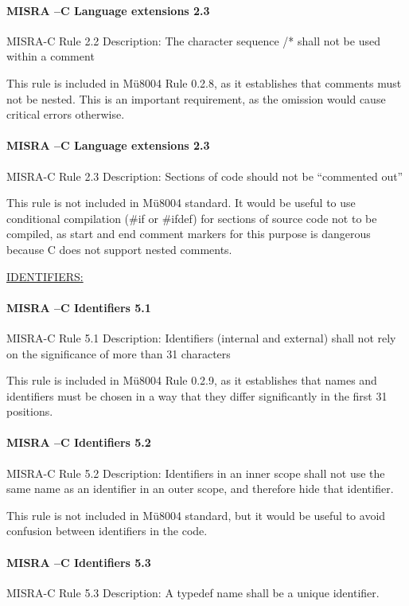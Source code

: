 \paragraph{MISRA –C Language extensions 2.3}
MISRA-C Rule 2.2 Description: The character sequence /* shall not be used within a comment

This rule is included in Mü8004 Rule 0.2.8, as it establishes that comments must not be nested. This is an important requirement, as the omission would cause critical errors otherwise.

\paragraph{MISRA –C Language extensions 2.3}
MISRA-C Rule 2.3 Description: Sections of code should not be “commented out”

This rule is not included in Mü8004 standard. It would be useful to use conditional compilation (\#if or \#ifdef) for sections of source code not to be compiled, as start and end comment markers for this purpose is dangerous because C does not support nested comments.

\begin{center}
\textsc{\underline{IDENTIFIERS:}}
\end{center}

\paragraph{MISRA –C Identifiers 5.1}
MISRA-C Rule 5.1 Description: Identifiers (internal and external) shall not rely on the significance of more than 31 characters

This rule is included in Mü8004 Rule 0.2.9, as it establishes that names and identifiers must be chosen in a way that they differ significantly in the first 31 positions.

\paragraph{MISRA –C Identifiers 5.2}
MISRA-C Rule 5.2 Description: Identifiers in an inner scope shall not use the same name as an identifier in an outer scope, and therefore hide that identifier.

This rule is not included in Mü8004 standard, but it would be useful to avoid confusion between identifiers in the code.


\paragraph{MISRA –C Identifiers 5.3}
MISRA-C Rule 5.3 Description: A typedef name shall be a unique identifier.

